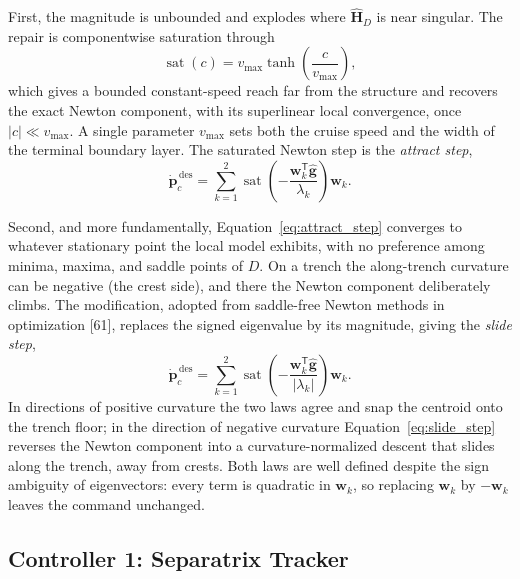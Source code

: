 \documentclass[12pt, letterpaper, oneside]{report}
\begin{document}
First, the magnitude is unbounded and explodes where $\hat{\mathbf{H}}_D$
is near singular. The repair is componentwise saturation through
\begin{equation}
\operatorname{sat}(c) = v_{\max}\tanh\!\left(\frac{c}{v_{\max}}\right),
\label{eq:sat}
\end{equation}
which gives a bounded constant-speed reach far from the structure and
recovers the exact Newton component, with its superlinear local
convergence, once $|c|\ll v_{\max}$. A single parameter $v_{\max}$ sets
both the cruise speed and the width of the terminal boundary layer. The
saturated Newton step is the \emph{attract step},
\begin{equation}
\dot{\mathbf{p}}_c^{\,\text{des}} = \sum_{k=1}^2 \operatorname{sat}\!\left(-\frac{\mathbf{w}_k^{\mathsf T}\hat{\mathbf{g}}}{\lambda_k}\right)\mathbf{w}_k.
\label{eq:attract_step}
\end{equation}

Second, and more fundamentally, Equation~\eqref{eq:attract_step} converges
to whatever stationary point the local model exhibits, with no preference
among minima, maxima, and saddle points of $D$. On a trench the
along-trench curvature can be negative (the crest side), and there the
Newton component deliberately climbs. The modification, adopted from
saddle-free Newton methods in optimization [61], replaces the signed
eigenvalue by its magnitude, giving the \emph{slide step},
\begin{equation}
\dot{\mathbf{p}}_c^{\,\text{des}} = \sum_{k=1}^2 \operatorname{sat}\!\left(-\frac{\mathbf{w}_k^{\mathsf T}\hat{\mathbf{g}}}{|\lambda_k|}\right)\mathbf{w}_k.
\label{eq:slide_step}
\end{equation}
In directions of positive curvature the two laws agree and snap the
centroid onto the trench floor; in the direction of negative curvature
Equation~\eqref{eq:slide_step} reverses the Newton component into a
curvature-normalized descent that slides along the trench, away from
crests. Both laws are well defined despite the sign ambiguity of
eigenvectors: every term is quadratic in $\mathbf{w}_k$, so replacing
$\mathbf{w}_k$ by $-\mathbf{w}_k$ leaves the command unchanged.

\subsection{Controller 1: Separatrix Tracker}
\label{sec:sep_controller}
\end{document}
